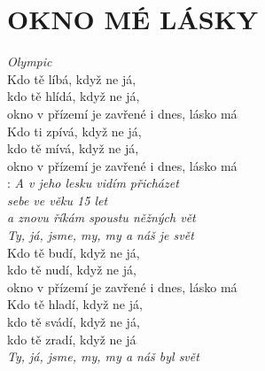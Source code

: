 \section*{\Huge OKNO MÉ LÁSKY}
\emph{Olympic}\\

Kdo tě líbá, když ne já,\\
kdo tě hlídá, když ne já,\\
okno v přízemí je zavřené i dnes,
lásko má\\

Kdo ti zpívá, když ne já,\\
kdo tě mívá, když ne já,\\
okno v přízemí je zavřené i dnes, lásko má\\

\textregistered:
\emph{A v jeho lesku vidím přicházet\\
sebe ve věku 15 let\\
a znovu říkám spoustu něžných vět\\
Ty, já, jsme, my, my a náš je svět}\\

Kdo tě budí, když ne já,\\
kdo tě nudí, když ne já,\\
okno v přízemí je zavřené i dnes, lásko má \hspace{1cm} \textregistered\\

Kdo tě hladí, když ne já,\\
kdo tě svádí, když ne já,\\
kdo tě zradí, když ne já\\

\emph{Ty, já, jsme, my, my a náš byl svět}

\newpage
